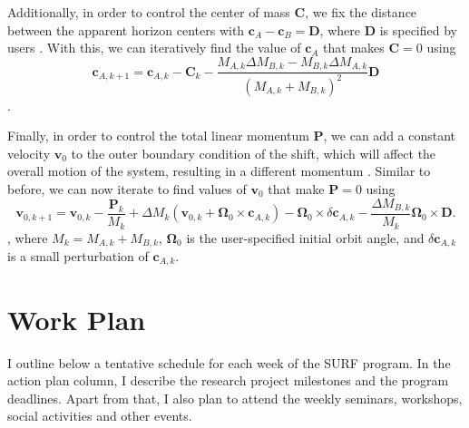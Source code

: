 \documentclass{../letter}
\renewcommand{\v}[1]{\boldsymbol{#1}}
\begin{document}
	Additionally, in order to control the center of mass $\v C$, we fix the distance between the apparent horizon centers with $\v c_A - \v c_B = \v D$, where $\v D$ is specified by users \cite{Serguei}. With this, we can iteratively find the value of $\v c_A$ that makes $\v C = 0$ using
	\begin{equation}
		\v c_{A,k+1} = \v c_{A,k} - \v C_k - \frac{M_{A,k}  \Delta M_{B,k} - M_{B,k} \Delta M_{A,k}}{(M_{A,k} + M_{B,k})^2} \v D
	\end{equation}
	\cite{Serguei}.

	Finally, in order to control the total linear momentum $\v P$, we can add a constant velocity $\v v_0$ to the outer boundary condition of the shift, which will affect the overall motion of the system, resulting in a different momentum \cite{Serguei}. Similar to before, we can now iterate to find values of $\v v_0$ that make $\v P = 0$ using
	\begin{equation}
			\v v_{0,k+1} = \v v_{0,k} - \frac{\v P_k}{M_k} + \Delta M_k (\v v_{0,k} + \v\Omega_0 \times \v c_{A,k}) - \v\Omega_0 \times \delta \v c_{A,k} - \frac{\Delta M_{B,k}}{M_k} \v\Omega_0 \times \v D.
		\end{equation}
	\cite{Serguei}, where $M_k = M_{A,k} + M_{B,k}$, $\v \Omega_0$ is the user-specified initial orbit angle, and $\delta \v c_{A,k}$ is a small perturbation of $\v c_{A,k}$.

	\section{Work Plan}

	I outline below a tentative schedule for each week of the SURF program. In the action plan column, I describe the research project milestones and the program deadlines. Apart from that, I also plan to attend the weekly seminars, workshops, social activities and other events.
\end{document}

